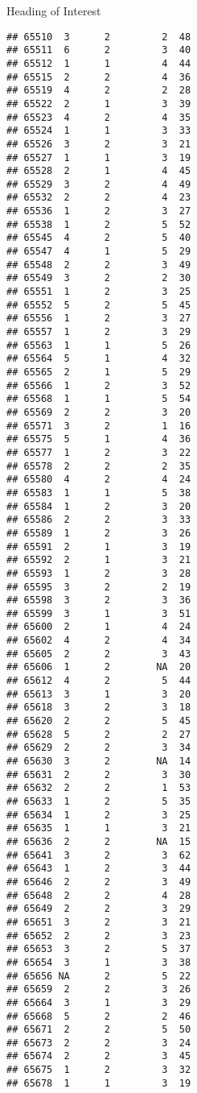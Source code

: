 \documentclass[
  ignorenonframetext,
]{beamer}
\begin{document}
\begin{frame}[fragile]{Heading of Interest}
\begin{verbatim}
## 65510  3      2         2  48
## 65511  6      2         3  40
## 65512  1      1         4  44
## 65515  2      2         4  36
## 65519  4      2         2  28
## 65522  2      1         3  39
## 65523  4      2         4  35
## 65524  1      1         3  33
## 65526  3      2         3  21
## 65527  1      1         3  19
## 65528  2      1         4  45
## 65529  3      2         4  49
## 65532  2      2         4  23
## 65536  1      2         3  27
## 65538  1      2         5  52
## 65545  4      2         5  40
## 65547  4      1         5  29
## 65548  2      2         3  49
## 65549  3      2         2  30
## 65551  1      2         3  25
## 65552  5      2         5  45
## 65556  1      2         3  27
## 65557  1      2         3  29
## 65563  1      1         5  26
## 65564  5      1         4  32
## 65565  2      1         5  29
## 65566  1      2         3  52
## 65568  1      1         5  54
## 65569  2      2         3  20
## 65571  3      2         1  16
## 65575  5      1         4  36
## 65577  1      2         3  22
## 65578  2      2         2  35
## 65580  4      2         4  24
## 65583  1      1         5  38
## 65584  1      2         3  20
## 65586  2      2         3  33
## 65589  1      2         3  26
## 65591  2      1         3  19
## 65592  2      1         3  21
## 65593  1      2         3  28
## 65595  3      2         2  19
## 65598  3      2         3  36
## 65599  3      1         3  51
## 65600  2      1         4  24
## 65602  4      2         4  34
## 65605  2      2         3  43
## 65606  1      2        NA  20
## 65612  4      2         5  44
## 65613  3      1         3  20
## 65618  3      2         3  18
## 65620  2      2         5  45
## 65628  5      2         2  27
## 65629  2      2         3  34
## 65630  3      2        NA  14
## 65631  2      2         3  30
## 65632  2      2         1  53
## 65633  1      2         5  35
## 65634  1      2         3  25
## 65635  1      1         3  21
## 65636  2      2        NA  15
## 65641  3      2         3  62
## 65643  1      2         3  44
## 65646  2      2         3  49
## 65648  2      2         4  28
## 65649  2      2         3  29
## 65651  3      2         3  21
## 65652  2      2         3  23
## 65653  3      2         5  37
## 65654  3      1         3  38
## 65656 NA      2         5  22
## 65659  2      2         3  26
## 65664  3      1         3  29
## 65668  5      2         2  46
## 65671  2      2         5  50
## 65673  2      2         3  24
## 65674  2      2         3  45
## 65675  1      2         3  32
## 65678  1      1         3  19

\end{verbatim}
\end{frame}
\end{document}
